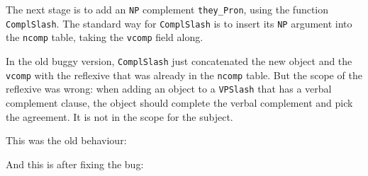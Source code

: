 \begin{EmptyItem}
\begin{Highlighting}[]
    \FunctionTok{=}  \NormalTok{;}
\FunctionTok{=}  \OtherTok{=>}  \NormalTok{; } \OtherTok{=>} 
\FunctionTok{=}  \NormalTok{;}
\end{Highlighting}
\end{EmptyItem}

The next stage is to add an \texttt{NP} complement \texttt{they\_Pron},
using the function \texttt{ComplSlash}. The standard way for
\texttt{ComplSlash} is to insert its \texttt{NP} argument into the
\texttt{ncomp} table, taking the \texttt{vcomp} field along.

In the old buggy version, \texttt{ComplSlash} just concatenated the new
object and the \texttt{vcomp} with the reflexive that was already in the
\texttt{ncomp} table. But the scope of the reflexive was wrong: when
adding an object to a \texttt{VPSlash} that has a verbal complement
clause, the object should complete the verbal complement and pick the
agreement. It is not in the scope for the subject.

This was the old behaviour:

\begin{EmptyItem}
\begin{Highlighting}[]
    \FunctionTok{=}  \NormalTok{;}
\FunctionTok{=}  \OtherTok{=>}  \NormalTok{; } \OtherTok{=>} 
\FunctionTok{=} \NormalTok{[] ;}
\end{Highlighting}
\end{EmptyItem}

And this is after fixing the bug:

\begin{EmptyItem}
\begin{Highlighting}[]
    \FunctionTok{=}  \NormalTok{;}
\FunctionTok{=} \OtherTok{=>}  \NormalTok{\} ;}
\FunctionTok{=} \NormalTok{[] ;}
\end{Highlighting}
\end{EmptyItem}

